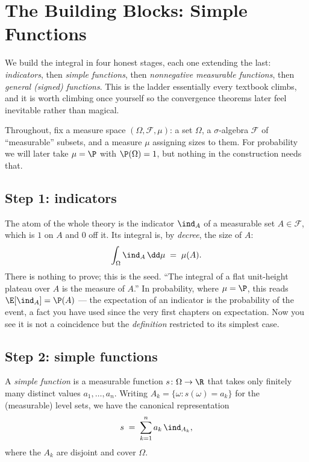 \section{The Building Blocks: Simple Functions}
\label{ch37:simple}

We build the integral in four honest stages, each one extending the last:
\emph{indicators}, then \emph{simple functions}, then \emph{nonnegative
measurable functions}, then \emph{general (signed) functions}. This is the
ladder essentially every textbook climbs, and it is worth climbing once
yourself so the convergence theorems later feel inevitable rather than magical.

Throughout, fix a measure space $(\Omega,\mathcal F,\mu)$: a set $\Omega$, a
$\sigma$-algebra $\mathcal F$ of ``measurable'' subsets, and a measure $\mu$
assigning sizes to them. For probability we will later take $\mu=\P$ with
$\P(\Omega)=1$, but nothing in the construction needs that.

\subsection{Step 1: indicators}

The atom of the whole theory is the indicator $\ind_A$ of a measurable set
$A\in\mathcal F$, which is $1$ on $A$ and $0$ off it. Its integral is, by
\emph{decree}, the size of $A$:
\[
  \int_\Omega \ind_A \,\dd\mu \;=\; \mu(A).
\]
There is nothing to prove; this is the seed. ``The integral of a flat
unit-height plateau over $A$ is the measure of $A$.'' In probability, where
$\mu=\P$, this reads $\E[\ind_A]=\P(A)$ --- the expectation of an indicator is
the probability of the event, a fact you have used since the very first chapters
on expectation. Now you see it is not a coincidence but the \emph{definition}
restricted to its simplest case.

\subsection{Step 2: simple functions}

\begin{definition}
\label{ch37:def-simple}
A \emph{simple function} is a measurable function $s\colon\Omega\to\R$ that takes
only finitely many distinct values $a_1,\dots,a_n$. Writing
$A_k=\{\omega: s(\omega)=a_k\}$ for the (measurable) level sets, we have the
canonical representation
\[
  s \;=\; \sum_{k=1}^n a_k\,\ind_{A_k},
\]
where the $A_k$ are disjoint and cover $\Omega$.
\end{definition}

